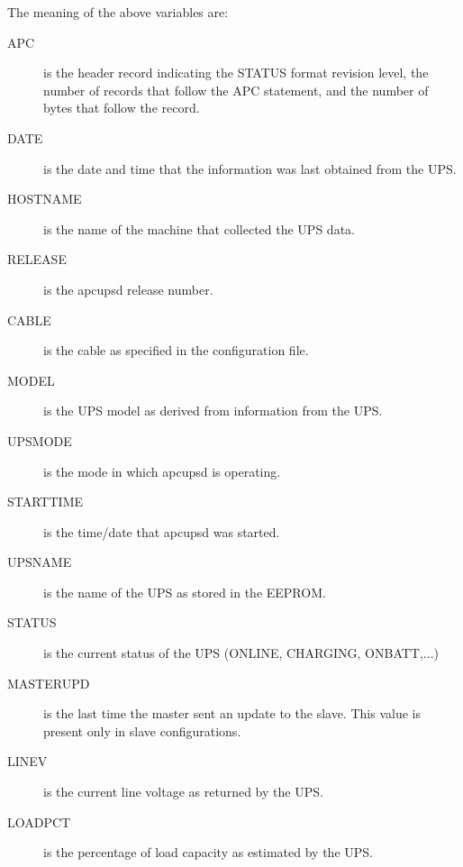 {{{{{{{{\label{index-Status-256}
The meaning of the above variables are:  

\begin{description}

\item [APC]
   is the header record indicating the STATUS format revision level, the number
of records that follow the APC statement, and the number of bytes that follow
the record.  

\item [DATE]
   is the date and time that the information was last obtained from the UPS.  

\item [HOSTNAME]
   is the name of the machine that collected the UPS data.  

\item [RELEASE]
   is the apcupsd release number.  

\item [CABLE]
   is the cable as specified in the configuration file.  

\item [MODEL]
   is the UPS model as derived from information from the UPS.  

\item [UPSMODE]
   is the mode in which apcupsd is operating.  

\item [STARTTIME]
   is the time/date that apcupsd was started.  

\item [UPSNAME]
   is the name of the UPS as stored in the EEPROM.  

\item [STATUS]
   is the current status of the UPS (ONLINE, CHARGING, ONBATT,...)  

\item [MASTERUPD]
   is the last time the master sent an update to the slave. This value is present
only in slave configurations.  

\item [LINEV]
   is the current line voltage as returned by the UPS.  

\item [LOADPCT]
   is the percentage of load capacity as estimated by the UPS.  


\end{description}}}}}}}}}

